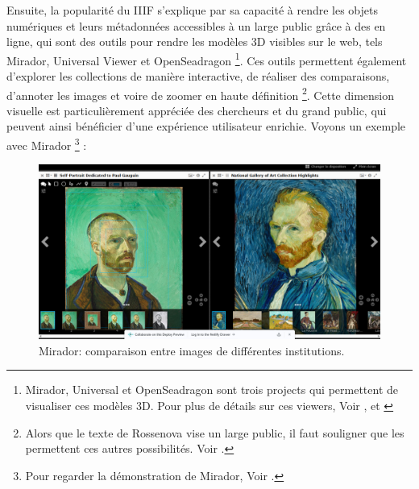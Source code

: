     Ensuite, la popularité du IIIF s'explique par sa capacité à rendre les objets numériques et leurs métadonnées accessibles à un large public grâce à des  en ligne, qui sont des outils pour rendre les modèles 3D visibles sur le web, tels Mirador, Universal Viewer et OpenSeadragon \footnote{Mirador, Universal et OpenSeadragon sont trois projects \opso qui permettent de visualiser ces modèles 3D. Pour plus de détails sur ces viewers, Voir \cite{mirador}, \cite{universalviewer} et \cite{openseadragon}}. Ces outils permettent également d'explorer les collections de manière interactive, de réaliser des comparaisons, d'annoter les images et voire de zoomer en haute définition \footnote{Alors que le texte de Rossenova vise un large public, il faut souligner que les  permettent ces autres possibilités. Voir \cite{rossenova2023iiif}.}. Cette dimension visuelle est particulièrement appréciée des chercheurs et du grand public, qui peuvent ainsi bénéficier d'une expérience utilisateur enrichie. Voyons un exemple avec Mirador \footnote{Pour regarder la démonstration de Mirador, Voir \cite{mirador_demo}.} :

        \begin{figure}[h!]
            \centering
            \includegraphics[width=12cm]{02_images/part_01/11_mirador_01.png}
            \caption{Mirador: comparaison entre images de différentes institutions.}
        \end{figure}

